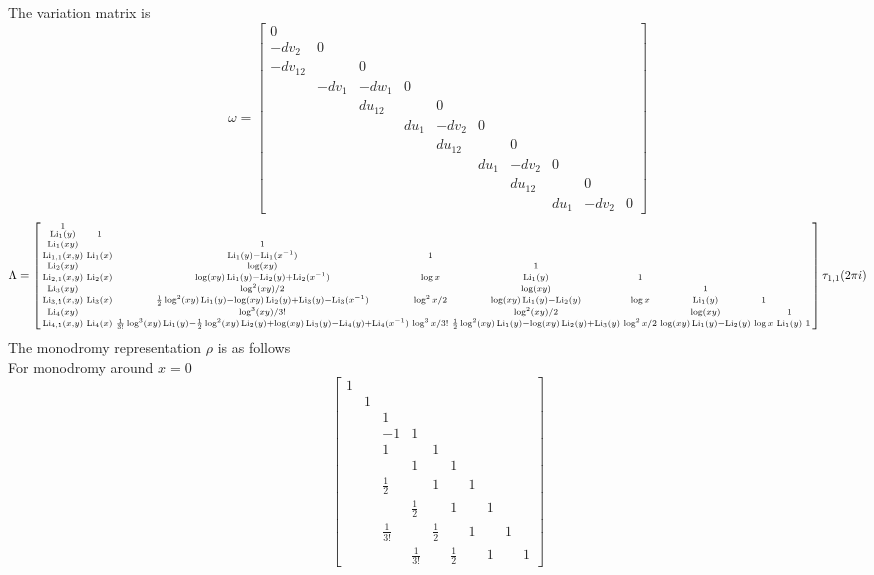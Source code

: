\documentclass[main]{subfiles}
\begin{document}
The variation matrix is
\[\omega=\begin{bmatrix}
0&&&&&&&&&\\
-dv_2&0&&&&&&&&\\
-dv_{12}&&0&&&&&&&\\
&-dv_1&-dw_1&0&&&&&&\\
&&du_{12}&&0&&&&&\\
&&&du_1&-dv_2&0&&&&\\
&&&&du_{12}&&0&&&\\
&&&&&du_1&-dv_2&0&&\\
&&&&&&du_{12}&&0&\\
&&&&&&&du_1&-dv_2&0
\end{bmatrix}\]
\[\Lambda=\left[\begin{smallmatrix}
1\\
\operatorname{Li}_1(y)&1\\
\operatorname{Li}_1(xy)&&1\\
\operatorname{Li}_{1,1}(x,y)&\operatorname{Li}_1(x)&\operatorname{Li}_1(y)-\operatorname{Li}_1(x^{-1})&1\\
\operatorname{Li}_2(xy)&&\log(xy)&&1\\
\operatorname{Li}_{2,1}(x,y)&\operatorname{Li}_2(x)&\log(xy)\operatorname{Li}_1(y)-\operatorname{Li}_2(y)+\operatorname{Li}_2(x^{-1})&\log x&\operatorname{Li}_1(y)&1\\
\operatorname{Li}_3(xy)&&\log^2(xy)/2&&\log(xy)&&1\\
\operatorname{Li}_{3,1}(x,y)&\operatorname{Li}_3(x)&\frac{1}{2}\log^2(xy)\operatorname{Li}_1(y)-\log(xy)\operatorname{Li}_2(y)+\operatorname{Li}_3(y)-\operatorname{Li}_3(x^{-1})&\log^2x/2&\log(xy)\operatorname{Li}_1(y)-\operatorname{Li}_2(y)&\log x&\operatorname{Li}_1(y)&1\\
\operatorname{Li}_4(xy)&&\log^3(xy)/3!&&\log^2(xy)/2&&\log(xy)&&1\\
\operatorname{Li}_{4,1}(x,y)&\operatorname{Li}_4(x)&\frac{1}{3!}\log^3(xy)\operatorname{Li}_1(y)-\frac{1}{2}\log^2(xy)\operatorname{Li}_2(y)+\log(xy)\operatorname{Li}_3(y)-\operatorname{Li}_4(y)+\operatorname{Li}_4(x^{-1})&\log^3x/3!&\frac{1}{2}\log^2(xy)\operatorname{Li}_1(y)-\log(xy)\operatorname{Li}_2(y)+\operatorname{Li}_3(y)&\log^2x/2&\log(xy)\operatorname{Li}_1(y)-\operatorname{Li}_2(y)&\log x&\operatorname{Li}_1(y)&1
\end{smallmatrix}\right]\tau_{1,1}(2\pi i)\]
The monodromy representation $\rho$ is as follows \\
For monodromy around $x=0$
\[\begin{bmatrix}
1&&&&&&&&&\\
&1&&&&&&&&\\
&&1&&&&&&&\\
&&-1&1&&&&&&\\
&&1&&1&&&&&\\
&&&1&&1&&&&\\
&&\frac{1}{2}&&1&&1&&&\\
&&&\frac{1}{2}&&1&&1&&\\
&&\frac{1}{3!}&&\frac{1}{2}&&1&&1&\\
&&&\frac{1}{3!}&&\frac{1}{2}&&1&&1
\end{bmatrix}\]
\end{document}
